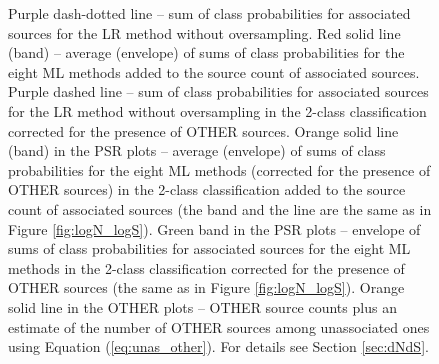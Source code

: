 \begin{figure}[h]
{Purple dash-dotted line -- sum of class probabilities for associated sources for the LR method without oversampling.
Red solid line (band) -- average (envelope) of sums of class probabilities for the eight ML methods added to the source count of associated sources. 
Purple dashed line -- sum of class probabilities for associated sources for the LR method without oversampling in the 2-class classification corrected for the presence of OTHER sources.
Orange solid line (band) in the PSR plots -- average (envelope) of sums of class probabilities for the eight ML methods (corrected for the presence of OTHER sources) in the 2-class classification added to the source count of associated sources (the band and the line are the same as in Figure \ref{fig:logN_logS}).
Green band in the PSR plots -- envelope of sums of class probabilities for associated sources for the eight ML methods in the 2-class classification corrected for the presence of OTHER sources (the same as in Figure \ref{fig:logN_logS}).
Orange solid line in the OTHER plots -- OTHER source counts plus an estimate of the number of OTHER sources among unassociated ones using Equation (\ref{eq:unas_other}). 
For details see Section \ref{sec:dNdS}.
}  
\label{fig:logN_logS_3classes}
\end{figure}



